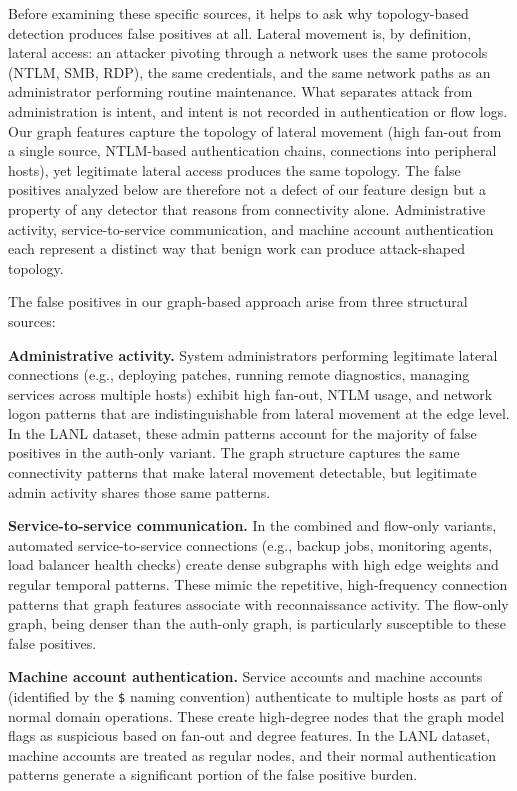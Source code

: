 \documentclass[letterpaper,twocolumn,10pt]{article}
\begin{document}
Before examining these specific sources, it helps to ask why topology-based detection produces false positives at all. Lateral movement is, by definition, lateral access: an attacker pivoting through a network uses the same protocols (NTLM, SMB, RDP), the same credentials, and the same network paths as an administrator performing routine maintenance. What separates attack from administration is intent, and intent is not recorded in authentication or flow logs. Our graph features capture the topology of lateral movement (high fan-out from a single source, NTLM-based authentication chains, connections into peripheral hosts), yet legitimate lateral access produces the same topology. The false positives analyzed below are therefore not a defect of our feature design but a property of any detector that reasons from connectivity alone. Administrative activity, service-to-service communication, and machine account authentication each represent a distinct way that benign work can produce attack-shaped topology.

The false positives in our graph-based approach arise from three structural sources:

\textbf{Administrative activity.} System administrators performing legitimate lateral connections (e.g., deploying patches, running remote diagnostics, managing services across multiple hosts) exhibit high fan-out, NTLM usage, and network logon patterns that are indistinguishable from lateral movement at the edge level. In the LANL dataset, these admin patterns account for the majority of false positives in the auth-only variant. The graph structure captures the same connectivity patterns that make lateral movement detectable, but legitimate admin activity shares those same patterns.

\textbf{Service-to-service communication.} In the combined and flow-only variants, automated service-to-service connections (e.g., backup jobs, monitoring agents, load balancer health checks) create dense subgraphs with high edge weights and regular temporal patterns. These mimic the repetitive, high-frequency connection patterns that graph features associate with reconnaissance activity. The flow-only graph, being denser than the auth-only graph, is particularly susceptible to these false positives.

\textbf{Machine account authentication.} Service accounts and machine accounts (identified by the \texttt{\$} naming convention) authenticate to multiple hosts as part of normal domain operations. These create high-degree nodes that the graph model flags as suspicious based on fan-out and degree features. In the LANL dataset, machine accounts are treated as regular nodes, and their normal authentication patterns generate a significant portion of the false positive burden.
\end{document}
